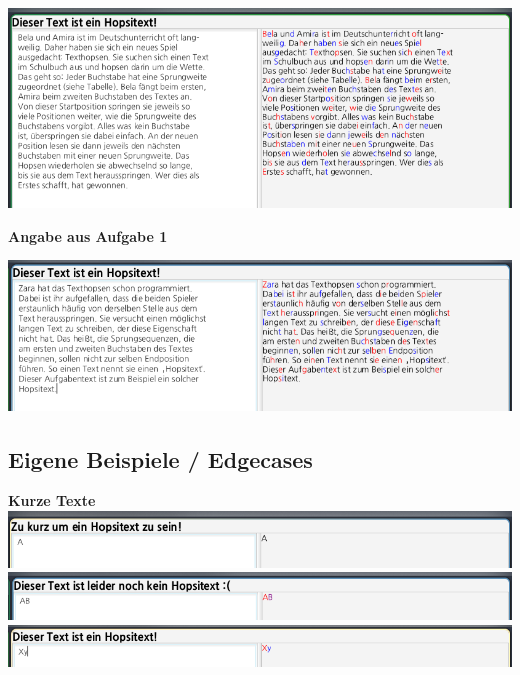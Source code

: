 \documentclass[a4paper,10pt,ngerman]{scrartcl}
\begin{document}
\includegraphics[scale=0.55]{junioraufgabe2-eingabe.png}
\newline

\textbf{Angabe aus Aufgabe 1}
\newline

\includegraphics[scale=0.55]{aufgabe1-angabe.png}

\subsection{Eigene Beispiele / Edgecases}

\textbf{Kurze Texte}
\newline
\newline
\includegraphics[scale=0.55]{kurz1.png}
\newline
\includegraphics[scale=0.55]{kurz2.png}
\newline
\includegraphics[scale=0.55]{kurz3.png}
\end{document}

